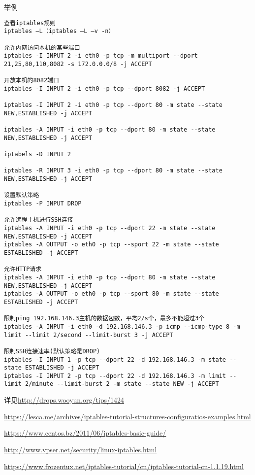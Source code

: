 举例
\begin{verbatim}
查看iptables规则
iptables –L（iptables –L –v -n）

允许内网访问本机的某些端口
iptables -I INPUT 2 -i eth0 -p tcp -m multiport --dport 21,25,80,110,8082 -s 172.0.0.0/8 -j ACCEPT

开放本机的8082端口
iptables -I INPUT 2 -i eth0 -p tcp --dport 8082 -j ACCEPT

iptables -I INPUT 2 -i eth0 -p tcp --dport 80 -m state --state NEW,ESTABLISHED -j ACCEPT 

iptables -A INPUT -i eth0 -p tcp --dport 80 -m state --state NEW,ESTABLISHED -j ACCEPT 

iptabels -D INPUT 2 

iptables -R INPUT 3 -i eth0 -p tcp --dport 80 -m state --state NEW,ESTABLISHED -j ACCEPT 

设置默认策略
iptables -P INPUT DROP 

允许远程主机进行SSH连接
iptables -A INPUT -i eth0 -p tcp --dport 22 -m state --state NEW,ESTABLISHED -j ACCEPT 
iptables -A OUTPUT -o eth0 -p tcp --sport 22 -m state --state ESTABLISHED -j ACCEPT 

允许HTTP请求
iptables -A INPUT -i eth0 -p tcp --dport 80 -m state --state NEW,ESTABLISHED -j ACCEPT 
iptables -A OUTPUT -o eth0 -p tcp --sport 80 -m state --state ESTABLISHED -j ACCEPT 

限制ping 192.168.146.3主机的数据包数，平均2/s个，最多不能超过3个
iptables -A INPUT -i eth0 -d 192.168.146.3 -p icmp --icmp-type 8 -m limit --limit 2/second --limit-burst 3 -j ACCEPT 

限制SSH连接速率(默认策略是DROP)
iptables -I INPUT 1 -p tcp --dport 22 -d 192.168.146.3 -m state --state ESTABLISHED -j ACCEPT  
iptables -I INPUT 2 -p tcp --dport 22 -d 192.168.146.3 -m limit --limit 2/minute --limit-burst 2 -m state --state NEW -j ACCEPT 

\end{verbatim}



详见\url{http://drops.wooyun.org/tips/1424}

\url{https://lesca.me/archives/iptables-tutorial-structures-configuratios-examples.html}

\url{https://www.centos.bz/2011/06/iptables-basic-guide/}

\url{http://www.vpser.net/security/linux-iptables.html}

\url{https://www.frozentux.net/iptables-tutorial/cn/iptables-tutorial-cn-1.1.19.html}















